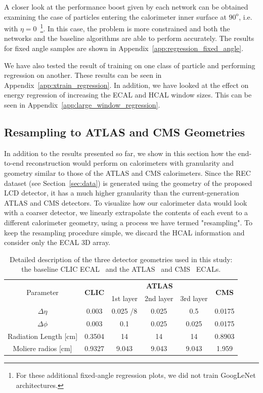A closer look at the performance boost given by each network can be obtained examining the case of particles entering the calorimeter inner surface at $90^{\mathrm o}$, i.e. with $\eta=0$~\footnote{For these additional fixed-angle regression plots, we did not train GoogLeNet architectures.}. In this case, the problem is more constrained and both the networks and the baseline algorithms are able to perform accurately. The results for fixed angle samples are shown in Appendix~\ref{app:regression_fixed_angle}.

We have also tested the result of training on one class of particle and performing regression on another. These results can be seen in Appendix~\ref{app:xtrain_regression}. In addition, we have looked at the effect on energy regression of increasing the ECAL and HCAL window sizes. This can be seen in Appendix~\ref{app:large_window_regression}.

\subsection{Resampling to ATLAS and CMS Geometries}\label{sec:resampling}

In addition to the results presented so far, we show in this section how the end-to-end reconstruction would perform on calorimeters with granularity and geometry similar to those of the ATLAS and CMS calorimeters. Since the REC dataset (see Section~\ref{sec:data}) is generated using the geometry of the proposed LCD detector, it has a much higher granularity than the current-generation ATLAS and CMS detectors. To visualize how our calorimeter data would look with a coarser detector, we linearly extrapolate the contents of each event to a different calorimeter geometry, using a process we have termed "resampling". To keep the resampling procedure simple, we discard the HCAL information and consider only the ECAL 3D array.

\begin{table}[tbp]
\centering
\caption{Detailed description of the three detector geometries used in this study: the baseline CLIC ECAL~\cite{CLIC_geometry} and the ATLAS~\cite{Aad:2008zzm} and CMS~\cite{Chatrchyan:2008aa} ECALs.\label{tab:resampling_geometry}}
\begin{tabular}{c|c|ccc|c}
\hline
\multirow{2}{*}{Parameter} & \multirow{2}{*}{\textbf{CLIC}} & \multicolumn{3}{c|}{\textbf{ATLAS}} & \multirow{2}{*}{\textbf{CMS}} \\
            &               & 1st layer & 2nd layer & 3rd layer & \\
\hline
$\Delta \eta$         & 0.003  & 0.025 /8 & 0.025 & 0.5   & 0.0175 \\
$\Delta \phi$         & 0.003  & 0.1      & 0.025 & 0.025 & 0.0175 \\
Radiation Length [cm] & 0.3504 & 14       & 14    & 14    & 0.8903 \\
Moliere radios [cm]   & 0.9327 & 9.043    & 9.043 & 9.043 & 1.959  \\
\hline 
\end{tabular}
\end{table}

